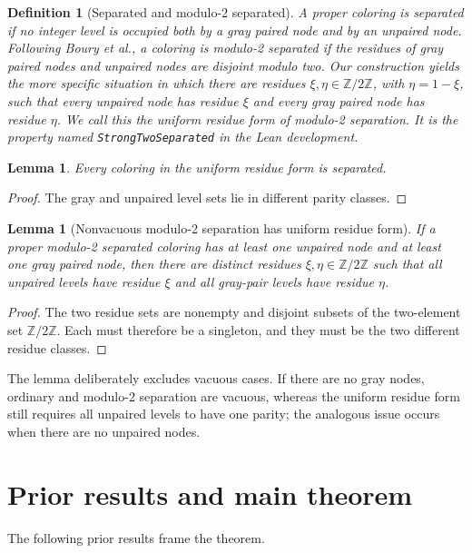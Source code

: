 \documentclass[11pt]{article}
\newtheorem{lemma}[theorem]{Lemma}
\newtheorem{definition}[theorem]{Definition}
\begin{document}
\begin{definition}[Separated and modulo-2 separated]
A proper coloring is \emph{separated} if no integer level is occupied both by a gray paired node and by an unpaired node.  Following Boury et al., a coloring is \emph{modulo-2 separated} if the residues of gray paired nodes and unpaired nodes are disjoint modulo two.  Our construction yields the more specific situation in which there are residues $\xi,\eta\in\mathbb Z/2\mathbb Z$, with $\eta=1-\xi$, such that every unpaired node has residue $\xi$ and every gray paired node has residue $\eta$.  We call this the \emph{uniform residue form} of modulo-2 separation.  It is the property named \texttt{StrongTwoSeparated} in the Lean development.
\end{definition}

\begin{lemma}
Every coloring in the uniform residue form is separated.
\end{lemma}
\begin{proof}
The gray and unpaired level sets lie in different parity classes.
\end{proof}

\begin{lemma}[Nonvacuous modulo-2 separation has uniform residue form]
\label{lem:modtwo-uniform}
If a proper modulo-2 separated coloring has at least one unpaired node and at least one gray paired node, then there are distinct residues $\xi,\eta\in\mathbb Z/2\mathbb Z$ such that all unpaired levels have residue $\xi$ and all gray-pair levels have residue $\eta$.
\end{lemma}
\begin{proof}
The two residue sets are nonempty and disjoint subsets of the two-element set $\mathbb Z/2\mathbb Z$.  Each must therefore be a singleton, and they must be the two different residue classes.
\end{proof}

The lemma deliberately excludes vacuous cases.  If there are no gray nodes, ordinary and modulo-2 separation are vacuous, whereas the uniform residue form still requires all unpaired levels to have one parity; the analogous issue occurs when there are no unpaired nodes.

\section{Prior results and main theorem}
\label{sec:prior}

The following prior results frame the theorem.
\end{document}
